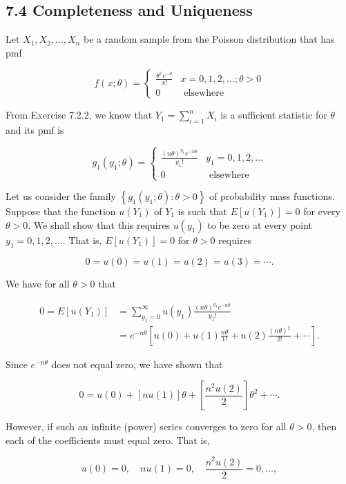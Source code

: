 \subsection*{7.4 Completeness and Uniqueness}
Let $X_{1}, X_{2}, \ldots, X_{n}$ be a random sample from the Poisson distribution that has pmf

$$
f(x ; \theta)= \begin{cases}\frac{\theta^{x} e^{-\theta}}{x!} & x=0,1,2, \ldots ; \theta>0 \\ 0 & \text { elsewhere }\end{cases}
$$

From Exercise 7.2.2, we know that $Y_{1}=\sum_{i=1}^{n} X_{i}$ is a sufficient statistic for $\theta$ and its pmf is

$$
g_{1}\left(y_{1} ; \theta\right)=\left\{\begin{array}{lc}
\frac{(n \theta)^{y_{1}} e^{-n \theta}}{y_{1}!} & y_{1}=0,1,2, \ldots \\
0 & \text { elsewhere }
\end{array}\right.
$$

Let us consider the family $\left\{g_{1}\left(y_{1} ; \theta\right): \theta>0\right\}$ of probability mass functions. Suppose that the function $u\left(Y_{1}\right)$ of $Y_{1}$ is such that $E\left[u\left(Y_{1}\right)\right]=0$ for every $\theta>0$. We shall show that this requires $u\left(y_{1}\right)$ to be zero at every point $y_{1}=0,1,2, \ldots$. That is, $E\left[u\left(Y_{1}\right)\right]=0$ for $\theta>0$ requires

$$
0=u(0)=u(1)=u(2)=u(3)=\cdots .
$$

We have for all $\theta>0$ that

$$
\begin{aligned}
0=E\left[u\left(Y_{1}\right)\right] & =\sum_{y_{1}=0}^{\infty} u\left(y_{1}\right) \frac{(n \theta)^{y_{1}} e^{-n \theta}}{y_{1}!} \\
& =e^{-n \theta}\left[u(0)+u(1) \frac{n \theta}{1!}+u(2) \frac{(n \theta)^{2}}{2!}+\cdots\right] .
\end{aligned}
$$

Since $e^{-n \theta}$ does not equal zero, we have shown that

$$
0=u(0)+[n u(1)] \theta+\left[\frac{n^{2} u(2)}{2}\right] \theta^{2}+\cdots .
$$

However, if such an infinite (power) series converges to zero for all $\theta>0$, then each of the coefficients must equal zero. That is,

$$
u(0)=0, \quad n u(1)=0, \quad \frac{n^{2} u(2)}{2}=0, \ldots,
$$


